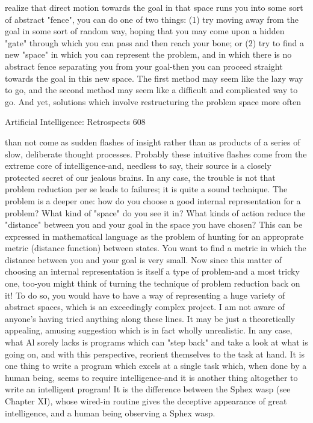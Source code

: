 {realize that direct motion towards the goal in that space runs you into some sort of
abstract "fence", you can do one of two things: (1) try moving away from the goal in
some sort of random way, hoping that you may come upon a hidden "gate" through
which you can pass and then reach your bone; or (2) try to find a new "space" in which
you can represent the problem, and in which there is no abstract fence separating you
from your goal-then you can proceed straight towards the goal in this new space. The first
method may seem like the lazy way to go, and the second method may seem like a
difficult and complicated way to go. And yet, solutions which involve restructuring the
problem space more often




Artificial Intelligence: Retrospects                                                     608

than not come as sudden flashes of insight rather than as products of a series of slow,
deliberate thought processes. Probably these intuitive flashes come from the extreme core
of intelligence-and, needless to say, their source is a closely protected secret of our
jealous brains.
        In any case, the trouble is not that problem reduction per se leads to failures; it is
quite a sound technique. The problem is a deeper one: how do you choose a good internal
representation for a problem? What kind of "space" do you see it in? What kinds of
action reduce the "distance" between you and your goal in the space you have chosen?
This can be expressed in mathematical language as the problem of hunting for an
approprate metric (distance function) between states. You want to find a metric in which
the distance between you and your goal is very small.
        Now since this matter of choosing an internal representation is itself a type of
problem-and a most tricky one, too-you might think of turning the technique of problem
reduction back on it! To do so, you would have to have a way of representing a huge
variety of abstract spaces, which is an exceedingly complex project. I am not aware of
anyone's having tried anything along these lines. It may be just a theoretically appealing,
amusing suggestion which is in fact wholly unrealistic. In any case, what Al sorely lacks
is programs which can "step back" and take a look at what is going on, and with this
perspective, reorient themselves to the task at hand. It is one thing to write a program
which excels at a single task which, when done by a human being, seems to require
intelligence-and it is another thing altogether to write an intelligent program! It is the
difference between the Sphex wasp (see Chapter XI), whose wired-in routine gives the
deceptive appearance of great intelligence, and a human being observing a Sphex wasp.

}
